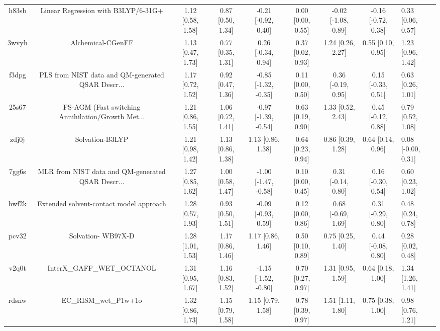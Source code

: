 \documentclass{article}
\begin{document}
\begin{center}
\begin{longtable}{|cccccccc|}
 h83sb &                Linear Regression with B3LYP/6-31G+ &  1.12 [0.58, 1.58] &  0.87 [0.50, 1.34] &   -0.21 [-0.92, 0.40] &  0.00 [0.00, 0.55] &  -0.02 [-1.08, 0.89] &  -0.16 [-0.72, 0.38] &     0.33 [0.06, 0.57] \\
 3wvyh &                                  Alchemical-CGenFF &  1.13 [0.47, 1.73] &  0.77 [0.35, 1.31] &    0.26 [-0.34, 0.94] &  0.37 [0.02, 0.93] &    1.24 [0.26, 2.27] &    0.55 [0.10, 0.95] &     1.23 [0.96, 1.42] \\
 f3dpg &  PLS from NIST data and QM-generated QSAR Descr... &  1.17 [0.72, 1.52] &  0.92 [0.47, 1.36] &  -0.85 [-1.32, -0.35] &  0.11 [0.00, 0.50] &   0.36 [-0.19, 0.95] &   0.15 [-0.33, 0.51] &     0.63 [0.26, 1.01] \\
 25s67 &  FS-AGM (Fast switching Annihilation/Growth Met... &  1.21 [0.86, 1.55] &  1.06 [0.72, 1.41] &  -0.97 [-1.39, -0.54] &  0.63 [0.19, 0.90] &    1.33 [0.52, 2.43] &   0.45 [-0.12, 0.88] &     0.79 [0.52, 1.08] \\
 zdj0j &                                    Solvation-B3LYP &  1.21 [0.98, 1.42] &  1.13 [0.86, 1.38] &     1.13 [0.86, 1.38] &  0.64 [0.23, 0.94] &    0.86 [0.39, 1.28] &    0.64 [0.14, 0.96] &    0.08 [-0.00, 0.31] \\
 7gg6s &  MLR from NIST data and QM-generated QSAR Descr... &  1.27 [0.85, 1.62] &  1.00 [0.58, 1.47] &  -1.00 [-1.47, -0.58] &  0.10 [0.00, 0.45] &   0.31 [-0.14, 0.80] &   0.16 [-0.30, 0.54] &     0.60 [0.23, 1.02] \\
 hwf2k &            Extended solvent-contact model approach &  1.28 [0.57, 1.93] &  0.93 [0.50, 1.51] &   -0.09 [-0.93, 0.59] &  0.12 [0.00, 0.86] &   0.68 [-0.69, 1.69] &   0.31 [-0.29, 0.80] &     0.48 [0.24, 0.78] \\
 pcv32 &                                 Solvation- WB97X-D &  1.28 [1.01, 1.53] &  1.17 [0.86, 1.46] &     1.17 [0.86, 1.46] &  0.50 [0.10, 0.89] &    0.75 [0.25, 1.40] &   0.44 [-0.08, 0.80] &     0.28 [0.02, 0.48] \\
 v2q0t &                         InterX\_GAFF\_WET\_OCTANOL &  1.31 [0.95, 1.67] &  1.16 [0.83, 1.52] &  -1.15 [-1.52, -0.80] &  0.70 [0.27, 0.97] &    1.31 [0.95, 1.59] &    0.64 [0.18, 1.00] &     1.34 [1.26, 1.41] \\
 rdsnw &                              EC\_RISM\_wet\_P1w+1o &  1.32 [0.86, 1.73] &  1.15 [0.79, 1.58] &     1.15 [0.79, 1.58] &  0.78 [0.39, 0.97] &    1.51 [1.11, 1.80] &    0.75 [0.38, 1.00] &     0.98 [0.76, 1.21] \\

\end{longtable}
\end{center}
\end{document}
